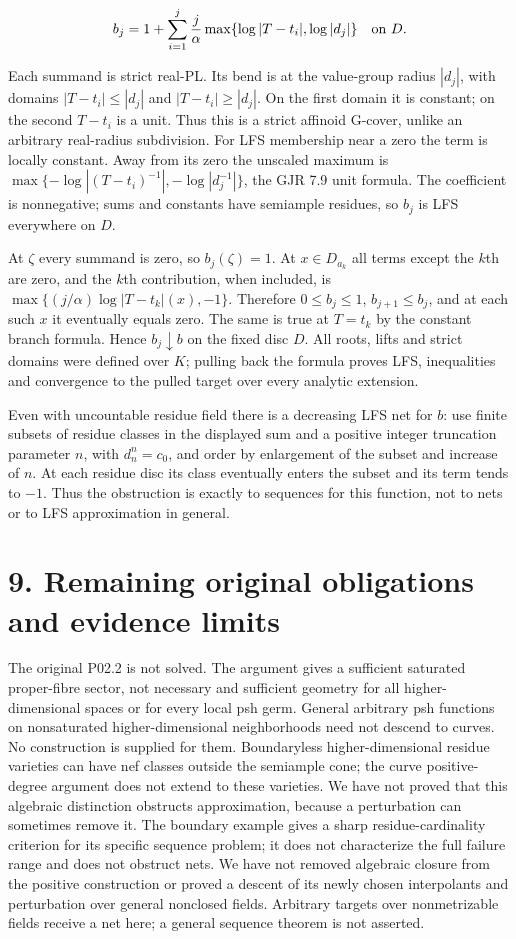 \documentclass[11pt]{article}
\begin{document}
\[b_j=1+\sum_{i=1}^j\frac{j}{\alpha}\max\{\log|T-t_i|,\log|d_j|\}\quad\hbox{on }D.\]

Each summand is strict real-PL. Its bend is at the value-group radius $|d_j|$, with domains $|T-t_i|\leq|d_j|$ and $|T-t_i|\geq|d_j|$. On the first domain it is constant; on the second $T-t_i$ is a unit. Thus this is a strict affinoid G-cover, unlike an arbitrary real-radius subdivision. For LFS membership near a zero the term is locally constant. Away from its zero the unscaled maximum is $\max\{-\log|(T-t_i)^{-1}|,-\log|d_j^{-1}|\}$, the GJR 7.9 unit formula. The coefficient is nonnegative; sums and constants have semiample residues, so $b_j$ is LFS everywhere on $D$.

At $\zeta$ every summand is zero, so $b_j(\zeta)=1$. At $x\in D_{a_k}$ all terms except the $k$th are zero, and the $k$th contribution, when included, is $\max\{(j/\alpha)\log|T-t_k|(x),-1\}$. Therefore $0\leq b_j\leq1$, $b_{j+1}\leq b_j$, and at each such $x$ it eventually equals zero. The same is true at $T=t_k$ by the constant branch formula. Hence $b_j\downarrow b$ on the fixed disc $D$. All roots, lifts and strict domains were defined over $K$; pulling back the formula proves LFS, inequalities and convergence to the pulled target over every analytic extension.

Even with uncountable residue field there is a decreasing LFS net for $b$: use finite subsets of residue classes in the displayed sum and a positive integer truncation parameter $n$, with $d_n^n=c_0$, and order by enlargement of the subset and increase of $n$. At each residue disc its class eventually enters the subset and its term tends to $-1$. Thus the obstruction is exactly to sequences for this function, not to nets or to LFS approximation in general.

\section*{9. Remaining original obligations and evidence limits}

The original P02.2 is not solved. The argument gives a sufficient saturated proper-fibre sector, not necessary and sufficient geometry for all higher-dimensional spaces or for every local psh germ. General arbitrary psh functions on nonsaturated higher-dimensional neighborhoods need not descend to curves. No construction is supplied for them. Boundaryless higher-dimensional residue varieties can have nef classes outside the semiample cone; the curve positive-degree argument does not extend to these varieties. We have not proved that this algebraic distinction obstructs approximation, because a perturbation can sometimes remove it. The boundary example gives a sharp residue-cardinality criterion for its specific sequence problem; it does not characterize the full failure range and does not obstruct nets. We have not removed algebraic closure from the positive construction or proved a descent of its newly chosen interpolants and perturbation over general nonclosed fields. Arbitrary targets over nonmetrizable fields receive a net here; a general sequence theorem is not asserted.
\end{document}
